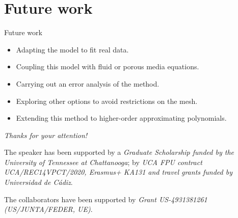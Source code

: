 \section{Future work}

\begin{frame}{Future work}
	\begin{itemize}\itemsep1em
		\item Adapting the model to fit real data.
		\item Coupling this model with fluid or porous media equations.
		\item Carrying out an error analysis of the method.
		\item Exploring other options to avoid restrictions on the mesh.
		\item Extending this method to higher-order approximating polynomials.
	\end{itemize}
\end{frame}


\begin{frame}{}
	\centering
	\vspace*{1cm}
	{\Huge
		\emph{Thanks for your attention!}}
	
	\vspace*{1cm}
	\begin{acknowledgements}
		The speaker has been supported by a \textit{Graduate Scholarship funded by the University of Tennessee at Chattanooga}; by \textit{UCA FPU contract UCA/REC14VPCT/2020, Erasmus+ KA131 and travel grants funded by Universidad de Cádiz}.
		
		The collaborators have been supported by \textit{Grant US-4931381261 (US/JUNTA/FEDER, UE)}.
	\end{acknowledgements}
\end{frame}